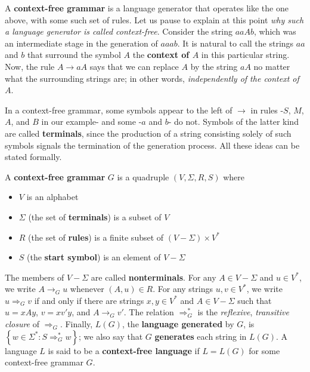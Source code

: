 \begin{multicols*}{2}
A \textbf{context-free grammar} is a language generator that operates like the one above, with some such set of rules. Let us pause to explain at this point \textit{why such a language generator is called context-free}. Consider the string $aaAb$, which was an intermediate stage in the generation of $aaab$. It is natural to call the strings $aa$ and $b$ that surround the symbol $A$ the \textbf{context of $A$} in this particular
string. Now, the rule $A \to aA$ says that we can replace $A$ by the string $aA$ no matter what the surrounding strings are; in other words, \textit{independently of the context of $A$}.

In a context-free grammar, some symbols appear to the left of $\to$ in rules -$S$, $M$, $A$, and $B$ in our example- and some -$a$ and $b$- do not. Symbols of the latter kind are called \textbf{terminals}, since the production of a string consisting solely of such symbols signals the termination of the generation process. All these ideas can be stated formally.
\end{multicols*}

\begin{definition}{}
  A \textbf{context-free grammar} $G$ is a quadruple $(V, \Sigma, R, S)$ where
  \begin{itemize}
    \item $V$ is an alphabet
    \item $\Sigma$ (the set of \textbf{terminals}) is a subset of $V$
    \item $R$ (the set of \textbf{rules}) is a finite subset of $(V - \Sigma) \times V^*$
    \item $S$ (the \textbf{start symbol}) is an element of $V - \Sigma$
  \end{itemize}
  The members of $V - \Sigma$ are called \textbf{nonterminals}. For any $A \in V - \Sigma$ and $u \in V^*$, we write $A \rightarrow_G u$ whenever $(A, u) \in R$. For any strings $u, v \in V^*$, we write $u \Rightarrow_G v$ if and only if there are strings $x, y \in V^*$ and $A \in V - \Sigma$ such that $u = xAy$, $v = xv'y$, and $A \rightarrow_G v'$. The relation $\Rightarrow_G^*$ is the \textit{reflexive}, \textit{transitive closure} of $\Rightarrow_G$. Finally, $L(G)$, the \textbf{language generated} by $G$, is $\left\{ w \in \Sigma^* : S \Rightarrow_G^* w \right\}$; we also say that $G$ \textbf{generates} each string in $L(G)$. A language $L$ is said to be a \textbf{context-free language} if $L = L(G)$ for some context-free grammar $G$.
\end{definition}

